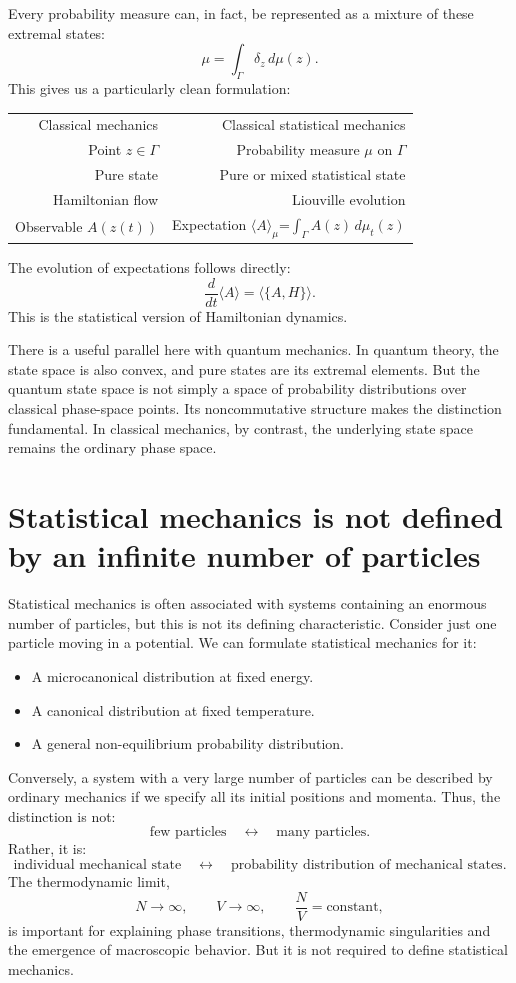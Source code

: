 Every probability measure can, in fact, be represented as a mixture of these
extremal states:
\[\boxed{\mu=\int_\Gamma \delta_z\,d\mu(z).}\]
This gives us a particularly clean formulation:
\begin{table}
    \begin{tabular}{rr}
        Classical mechanics	& Classical statistical mechanics\\
        Point \(z\in\Gamma\) &	Probability measure \(\mu\) on \(\Gamma\)\\
        Pure state&	Pure or mixed statistical state\\
        Hamiltonian flow&	Liouville evolution\\
        Observable \(A(z(t))\)	&Expectation \(\langle A\rangle_\mu\)=\(\int_\Gamma A(z)\,d\mu_t(z)\)
    \end{tabular}
\end{table}
The evolution of expectations follows directly:
\[\frac{d}{dt}\langle A\rangle=\langle\{A,H\}\rangle.\]
This is the statistical version of Hamiltonian dynamics.

There is a useful parallel here with quantum mechanics. In quantum theory, the
state space is also convex, and pure states are its extremal elements. But the
quantum state space is not simply a space of probability distributions over
classical phase-space points. Its noncommutative structure makes the
distinction fundamental. In classical mechanics, by contrast, the underlying
state space remains the ordinary phase space.

\section{Statistical mechanics is not defined by an infinite number of particles}
Statistical mechanics is often associated with systems containing an enormous
number of particles, but this is not its defining characteristic.
Consider just one particle moving in a potential.
We can formulate statistical mechanics for it:
\begin{itemize}
\item A microcanonical distribution at fixed energy.
\item A canonical distribution at fixed temperature.
\item A general non-equilibrium probability distribution.
\end{itemize}
Conversely, a system with a very large number of particles can be described by
ordinary mechanics if we specify all its initial positions and momenta.
Thus, the distinction is not:
\[
\text{few particles}\quad\longleftrightarrow\quad
\text{many particles}.
\]
Rather, it is:
\[
\boxed{
\text{individual mechanical state}
\quad\longleftrightarrow\quad
\text{probability distribution of mechanical states}.
}
\]
The thermodynamic limit,
\[
N\rightarrow\infty,\qquad
V\rightarrow\infty,\qquad
\frac NV=\text{constant},
\]
is important for explaining phase transitions, thermodynamic singularities and
the emergence of macroscopic behavior.
But it is not required to define statistical mechanics.

